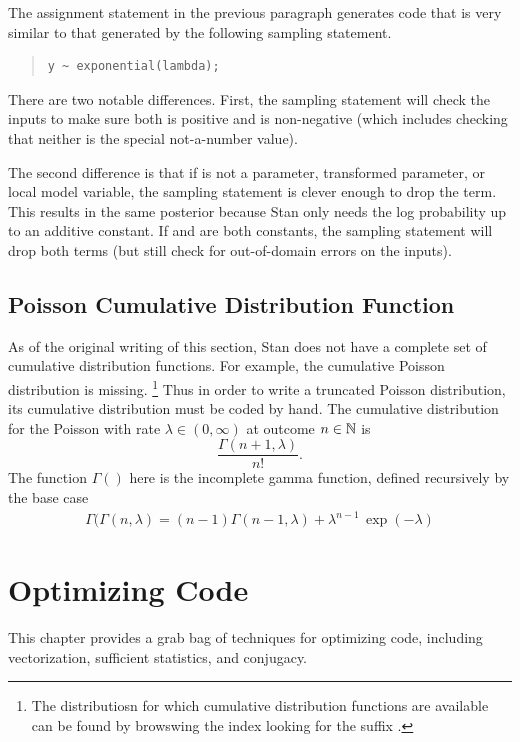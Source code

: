 The assignment statement in the previous paragraph generates 
\Cpp code that is very similar to that generated by the following
sampling statement.
%
\begin{quote}
\begin{Verbatim}
y ~ exponential(lambda);
\end{Verbatim}
\end{quote}
%
There are two notable differences.  First, the sampling statement will
check the inputs to make sure both  is positive and
 is non-negative (which includes checking that neither is the
special not-a-number value).

The second difference is that if  is not a parameter,
transformed parameter, or local model variable, the sampling statement
is clever enough to drop the  term.  This results in
the same posterior because Stan only needs the log probability up to
an additive constant.  If  and  are both
constants, the sampling statement will drop both terms (but still
check for out-of-domain errors on the inputs).

\section{Poisson Cumulative Distribution Function}

As of the original writing of this section, Stan does not have 
a complete set of cumulative distribution functions.  For example, the
cumulative Poisson distribution is missing.%
%
\footnote{The distributiosn for which cumulative distribution
  functions are available can be found by browswing the index looking
  for the suffix .}
%
Thus in order to write a truncated Poisson distribution, its
cumulative distribution must be coded by hand.  The cumulative
distribution for the Poisson with rate $\lambda \in (0,\infty)$ at outcome $n \in
\mathbb{N}$ is
\[
\frac{\Gamma(n+1,\lambda)}{n!}.
\]
The function $\Gamma()$ here is the incomplete gamma function, defined
recursively by the base case
\begin{eqnarray*}
\Gamma(
\Gamma(n,\lambda) = (n-1) \Gamma(n-1,\lambda) + \lambda^{n-1} \, \exp(-\lambda)
\end{eqnarray*}



\chapter{Optimizing \Stan Code}\label{optimization.chapter}
\noindent
This chapter provides a grab bag of techniques for optimizing \Stan
code, including vectorization, sufficient statistics, and conjugacy.

